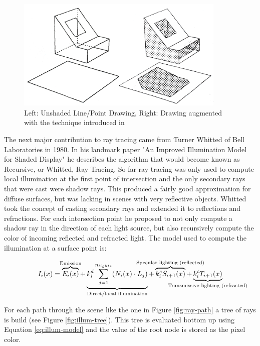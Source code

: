 \documentclass{ACGSeminar}
\begin{document}
\begin{figure}[htb!]
  \begin{centering}
    \includegraphics[width=10cm]{figures/Appel_Shading.png}\par
  \end{centering}
  \caption{Left: Unshaded Line/Point Drawing, Right: Drawing augmented with the technique introduced in \cite{Appel68}}
  \label{fig:appel_tracing}
\end{figure}

The next major contribution to ray tracing came from Turner Whitted of Bell Laboratories in 1980. In his landmark paper "An Improved Illumination Model for Shaded Display" \cite{Whitted:1980} he describes the algorithm that would become known as Recursive, or Whitted, Ray Tracing. So far ray tracing was only used to compute local illumination at the first point of intersection and the only secondary rays that were cast were shadow rays. This produced a fairly good approximation for diffuse surfaces, but was lacking in scenes with very reflective objects. Whitted took the concept of casting secondary rays and extended it to reflections and refractions. For each intersection point he proposed to not only compute a shadow ray in the direction of each light source, but also recursively compute the color of incoming reflected and refracted light. 
The model used to compute the illumination at a surface point is:

\begin{equation} \label{eq:illum-model}
I_{i}(x) = \overbrace{E_{i}(x)}^{\mathclap{\text{Emission}}} 
           + \underbrace{ k_{i}^{d} \sum_{j=1}^{n_{lights}} (N_{i}(x) \cdot L_{j})}_{\mathclap{\text{Direct/local illumination}}} 
           + \overbrace{k_{i}^{s}S_{i+1}(x)}^{\mathclap{\text{Specular lighting (reflected)}}} 
           + \underbrace{k_{i}^{t}T_{i+1}(x)}_{\mathclap{\text{Transmissive lighting (refracted)}}} 
\end{equation}

For each path through the scene like the one in Figure \ref{fig:ray-path} a tree of rays is build (see Figure \ref{fig:illum-tree}). This tree is evaluated bottom up using Equation \ref{eq:illum-model} and the value of the root node is stored as the pixel color.
\end{document}

